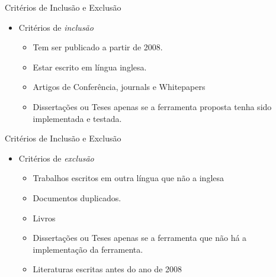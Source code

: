 \documentclass[t,14pt,mathserif]{beamer}
\begin{document}
\begin{frame}{Critérios de Inclusão e Exclusão}
    \begin{itemize}
      \item Critérios de \textit{inclusão}
              \begin{itemize}

                   \item Tem ser publicado a partir de 2008.
                   \item Estar escrito em língua inglesa.
                   \item Artigos de Conferência, journals e Whitepapers
                   \item Dissertações ou Teses apenas se a ferramenta proposta tenha sido
  implementada e testada.
              \end{itemize}
    \end{itemize}
\end{frame}
\begin{frame}{Critérios de Inclusão e Exclusão}
    \begin{itemize}
      \item Critérios de \textit{exclusão}
               \begin{itemize}
                       \item Trabalhos escritos em outra língua que não a inglesa
                       \item Documentos duplicados.
                       \item Livros
                       \item Dissertações ou Teses apenas se a ferramenta que
                         não há a implementação da ferramenta.
                       \item Literaturas escritas antes do ano de 2008
              \end{itemize}
      \end{itemize}
\end{frame}
\end{document}
